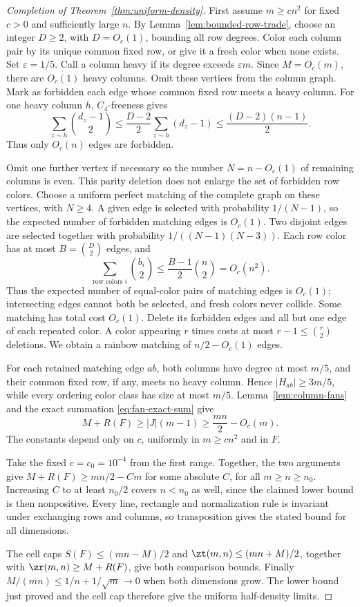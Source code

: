 \begin{proof}[Completion of Theorem~\ref{thm:uniform-density}]
First assume $m\ge cn^2$ for fixed $c>0$ and sufficiently large $n$.
By Lemma~\ref{lem:bounded-row-trade}, choose an integer $D\ge2$,
with $D=O_c(1)$, bounding all row degrees. Color each column pair by its unique common fixed row,
or give it a fresh color when none exists. Set $\varepsilon=1/5$. Call a column heavy if
its degree exceeds $\varepsilon m$. Since $M=O_c(m)$, there are
$O_c(1)$ heavy columns. Omit these vertices from the column graph.
Mark as forbidden each edge whose common fixed row meets a heavy column.
For one heavy column $h$, $C_4$-freeness gives
\[
 \sum_{z\sim h}\binom{d_z-1}{2}
 \le\frac{D-2}{2}\sum_{z\sim h}(d_z-1)
 \le\frac{(D-2)(n-1)}2.
\]
Thus only $O_c(n)$ edges are forbidden.

Omit one further vertex if necessary so the number $N=n-O_c(1)$
of remaining columns is even. This parity deletion does not enlarge the set
of forbidden row colors. Choose a uniform perfect matching of the complete
graph on these vertices, with $N\ge4$. A given edge is selected with
probability $1/(N-1)$, so the expected number of forbidden matching edges
is $O_c(1)$. Two disjoint edges are selected together with probability
$1/((N-1)(N-3))$. Each row color has at most $B=\binom D2$ edges, and
\[
 \sum_{\text{row colors }i}\binom{b_i}{2}
 \le\frac{B-1}{2}\binom n2=O_c(n^2).
\]
Thus the expected number of equal-color pairs of matching edges is $O_c(1)$;
intersecting edges cannot both be selected, and fresh colors never collide.
Some matching has total cost $O_c(1)$. Delete its forbidden edges
and all but one edge of each repeated color. A color appearing $r$ times
costs at most $r-1\le\binom r2$ deletions. We obtain a rainbow matching
of $n/2-O_c(1)$ edges.

For each retained matching edge $ab$, both columns have degree at most
$m/5$, and their common fixed row, if any, meets no heavy column.
Hence $|H_{ab}|\ge3m/5$, while every ordering color class has size at
most $m/5$. Lemma~\ref{lem:column-fans} and the exact summation
\eqref{eq:fan-exact-sum} give
\begin{equation}\label{eq:quadratic-error}
 M+R(F)\ge |J|(m-1)\ge\frac{mn}{2}-O_c(m).
\end{equation}
The constants depend only on $c$, uniformly in $m\ge cn^2$ and in $F$.

Take the fixed $c=c_0=10^{-4}$ from the first range. Together, the two
arguments give $M+R(F)\ge mn/2-Cm$ for some absolute $C$, for all
$m\ge n\ge n_0$. Increasing $C$ to at least $n_0/2$ covers $n<n_0$
as well, since the claimed lower bound is then nonpositive.
Every line, rectangle and normalization rule is invariant under exchanging
rows and columns, so transposition gives the stated bound for all dimensions.

The cell caps $S(F)\le(mn-M)/2$ and $\zt(m,n)\le(mn+M)/2$, together
with $\zr(m,n)\ge M+R(F)$, give both comparison bounds.
Finally $M/(mn)\le1/n+1/\sqrt m\to0$ when both dimensions grow.
The lower bound just proved and the cell cap therefore give the uniform
half-density limits.
\end{proof}

